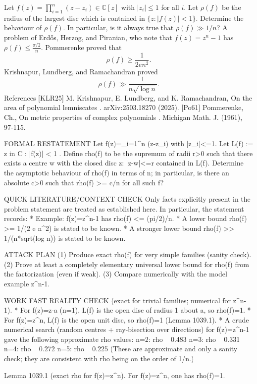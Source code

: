 
Let $f(z)=\prod_{i=1}^n(z-z_i)\in \mathbb{C}[z]$ with $\lvert z_i\rvert \leq 1$ for all $i$. Let $\rho(f)$ be the radius of the largest disc which is contained in $\{z: \lvert f(z)\rvert< 1\}$. Determine the behaviour of $\rho(f)$. In particular, is it always true that $\rho(f)\gg 1/n$? A problem of Erd\H{o}s, Herzog, and Piranian, who note that $f(z)=z^n-1$ has $\rho(f) \leq \frac{\pi/2}{n}$. Pommerenke \cite{Po61} proved that\[\rho(f) \geq \frac{1}{2en^2}.\]Krishnapur, Lundberg, and Ramachandran \cite{KLR25} proved\[\rho(f) \gg \frac{1}{n\sqrt{\log n}}.\] References [KLR25] M. Krishnapur, E. Lundberg, and K. Ramachandran, On the area of polynomial lemniscates . arXiv:2503.18270 (2025). [Po61] Pommerenke, Ch., On metric properties of complex polynomials . Michigan Math. J. (1961), 97-115.



FORMAL RESTATEMENT
Let f(z)=\prod_{i=1}^n (z-z_i) with |z_i|<=1. Let
  L(f) := { z in C : |f(z)| < 1 }.
Define rho(f) to be the supremum of radii r>0 such that there exists a centre w with the closed disc {z: |z-w|<=r} contained in L(f).
Determine the asymptotic behaviour of rho(f) in terms of n; in particular, is there an absolute c>0 such that rho(f) >= c/n for all such f?

QUICK LITERATURE/CONTEXT CHECK
Only facts explicitly present in the problem statement are treated as established here. In particular, the statement records:
* Example: f(z)=z^n-1 has rho(f) <= (pi/2)/n.
* A lower bound rho(f) >= 1/(2 e n^2) is stated to be known.
* A stronger lower bound rho(f) >> 1/(n*sqrt(log n)) is stated to be known.

ATTACK PLAN
(1) Produce exact rho(f) for very simple families (sanity check).
(2) Prove at least a completely elementary universal lower bound for rho(f) from the factorization (even if weak).
(3) Compare numerically with the model example z^n-1.

WORK
FAST REALITY CHECK (exact for trivial families; numerical for z^n-1).
* For f(z)=z-a (n=1), L(f) is the open disc of radius 1 about a, so rho(f)=1.
* For f(z)=z^n, L(f) is the open unit disc, so rho(f)=1 (Lemma 1039.1).
* A crude numerical search (random centres + ray-bisection over directions) for f(z)=z^n-1 gave the following approximate rho values:
  n=2: rho ~ 0.483
  n=3: rho ~ 0.331
  n=4: rho ~ 0.272
  n=5: rho ~ 0.225
  (These are approximate and only a sanity check; they are consistent with rho being on the order of 1/n.)

Lemma 1039.1 (exact rho for f(z)=z^n).
For f(z)=z^n, one has rho(f)=1.


